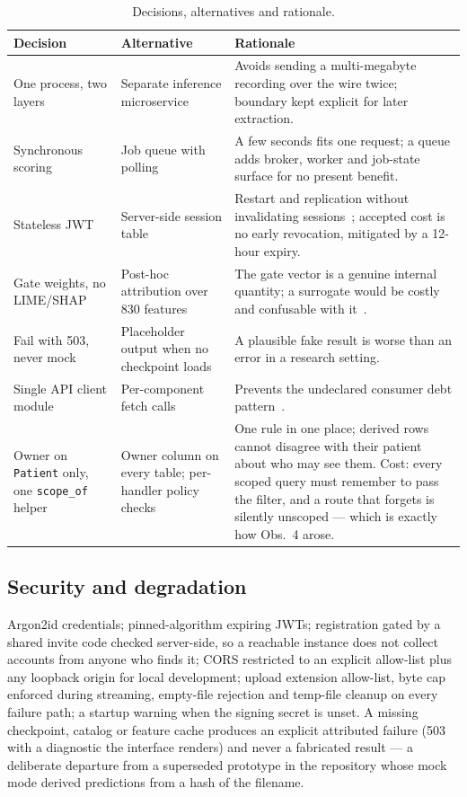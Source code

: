 \documentclass[11pt,a4paper]{article}
\newcommand{\code}[1]{\texttt{#1}}
\begin{document}
\begin{table}[H]\centering\caption{Decisions, alternatives and rationale.}
\label{tab:dec}\scriptsize
\begin{tabularx}{\linewidth}{@{}L{2.7cm} L{2.9cm} Y@{}}
\toprule
\textbf{Decision} & \textbf{Alternative} & \textbf{Rationale} \\
\midrule
One process, two layers & Separate inference microservice & Avoids sending a
multi-megabyte recording over the wire twice; boundary kept explicit for later
extraction. \\
Synchronous scoring & Job queue with polling & A few seconds fits one request;
a queue adds broker, worker and job-state surface for no present benefit. \\
Stateless JWT & Server-side session table & Restart and replication without
invalidating sessions~\cite{fielding2000}; accepted cost is no early revocation,
mitigated by a 12-hour expiry. \\
Gate weights, no LIME/SHAP & Post-hoc attribution over 830 features & The gate
vector is a genuine internal quantity; a surrogate would be costly and confusable
with it~\cite{rudin2019}. \\
Fail with 503, never mock & Placeholder output when no checkpoint loads & A
plausible fake result is worse than an error in a research setting. \\
Single API client module & Per-component fetch calls & Prevents the undeclared
consumer debt pattern~\cite{sculley2015}. \\
Owner on \code{Patient} only, one \code{scope\_of} helper & Owner column on every
table; per-handler policy checks & One rule in one place; derived rows cannot
disagree with their patient about who may see them. Cost: every scoped query must
remember to pass the filter, and a route that forgets is silently unscoped ---
which is exactly how Obs.~4 arose. \\
\bottomrule
\end{tabularx}
\end{table}

\subsection{Security and degradation}

Argon2id credentials; pinned-algorithm expiring JWTs; registration gated by a
shared invite code checked server-side, so a reachable instance does not collect
accounts from anyone who finds it; CORS restricted to an explicit allow-list plus
any loopback origin for local development; upload extension
allow-list, byte cap enforced during streaming, empty-file rejection and
temp-file cleanup on every failure path; a startup warning when the signing
secret is unset. A missing checkpoint, catalog or feature cache produces an
explicit attributed failure (503 with a diagnostic the interface renders) and
never a fabricated result --- a deliberate departure from a superseded prototype
in the repository whose mock mode derived predictions from a hash of the
filename.
\end{document}
